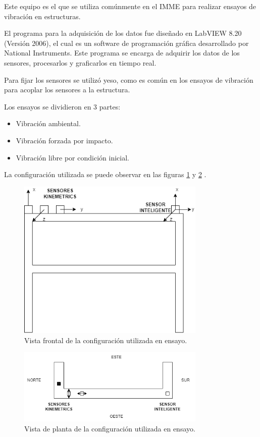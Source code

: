 Este equipo es el que se utiliza comúnmente en el IMME para realizar ensayos de vibración en estructuras.

El programa para la adquisición de los datos fue diseñado en LabVIEW 8.20 (Versión 2006), el cual es un software de programación gráfica desarrollado por National Instruments. Este programa se encarga de adquirir los datos de los sensores, procesarlos y graficarlos en tiempo real.

Para fijar los sensores se utilizó yeso, como es común en los ensayos de vibración para acoplar los sensores a la estructura.

Los ensayos se dividieron en 3 partes:
\begin{itemize}
    \item Vibración ambiental.
    \item Vibración forzada por impacto.
    \item Vibración libre por condición inicial.
\end{itemize}

La configuración utilizada se puede observar en las figuras \ref{fig:configuracionensayofrontal} y \ref{fig:configuracionensayoplanta} .

\begin{figure}[H]
    \centering
    \includegraphics[width = 0.8\textwidth]{imagenes/cap3_resultados/Ensayos/CONFIGURACION1.png}
    \caption{Vista frontal de la configuración utilizada en ensayo.}
    \label{fig:configuracionensayofrontal}
\end{figure}

\begin{figure}[H]
    \centering
    \includegraphics[width = 0.8\textwidth]{imagenes/cap3_resultados/Ensayos/CONFIGURACION1PLANTA.png}
    \caption{Vista de planta de la configuración utilizada en ensayo.}
    \label{fig:configuracionensayoplanta}
\end{figure}


